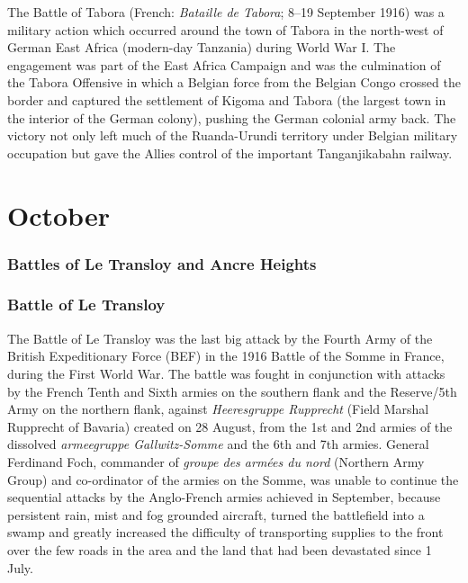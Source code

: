 \documentclass[a4paper,]{book}
\begin{document}
The Battle of Tabora (French: \textit{Bataille de Tabora}; 8–19 September 1916) was a military action which occurred around the town of Tabora in the north-west of German East Africa (modern-day Tanzania) during World War I. The engagement was part of the East Africa Campaign and was the culmination of the Tabora Offensive in which a Belgian force from the Belgian Congo crossed the border and captured the settlement of Kigoma and Tabora (the largest town in the interior of the German colony), pushing the German colonial army back. The victory not only left much of the Ruanda-Urundi territory under Belgian military occupation but gave the Allies control of the important Tanganjikabahn railway.




\chapter{October}

\subsection{Battles of Le Transloy and Ancre Heights}

\subsection{Battle of Le Transloy}

The Battle of Le Transloy was the last big attack by the Fourth Army of the British Expeditionary Force (BEF) in the 1916 Battle of the Somme in France, during the First World War. The battle was fought in conjunction with attacks by the French Tenth and Sixth armies on the southern flank and the Reserve/5th Army on the northern flank, against \textit{Heeresgruppe Rupprecht} (Field Marshal Rupprecht of Bavaria) created on 28 August, from the 1st and 2nd armies of the dissolved \textit{armeegruppe Gallwitz-Somme} and the 6th and 7th armies. General Ferdinand Foch, commander of \textit{groupe des armées du nord} (Northern Army Group) and co-ordinator of the armies on the Somme, was unable to continue the sequential attacks by the Anglo-French armies achieved in September, because persistent rain, mist and fog grounded aircraft, turned the battlefield into a swamp and greatly increased the difficulty of transporting supplies to the front over the few roads in the area and the land that had been devastated since 1 July.
\end{document}

